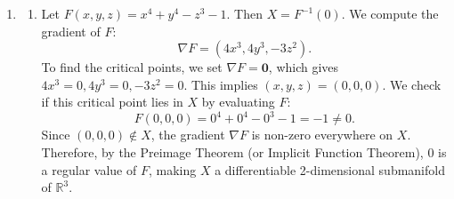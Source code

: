 \documentclass[10pt,a4paper]{article}
\begin{document}
\begin{enumerate}[label=\fbox{\arabic*}]
        To verify directly:
        \begin{align*}
          |x_m(t) - x(t)| &= \left| \left( x_0^{1/2} + \frac{1}{2} f_m(t) \right)^2 - \left( x_0^{1/2} + \frac{1}{2} f(t) \right)^2 \right| \\
          &= \frac{1}{2} |f_m(t) - f(t)| \cdot \left| 2x_0^{1/2} + \frac{1}{2}(f_m(t) + f(t)) \right| \\
          &\le \frac{1}{2} \cdot \frac{2}{m} \cdot \left( 2x_0^{1/2} + \frac{\pi}{2} \right) \xrightarrow{m \to \infty} 0.
        \end{align*}
        Thus, $x_m(t)$ converges uniformly to the continuous function $x(t)$ on $[0, \infty)$.

  \item %
        \begin{enumerate}[label=(\arabic*)]
          \item Let $F(x,y,z) = x^4 + y^4 - z^3 - 1$. Then $X = F^{-1}(0)$. We compute the gradient of $F$:
          \[
            \nabla F = (4x^3, 4y^3, -3z^2).
          \]
          To find the critical points, we set $\nabla F = \mathbf{0}$, which gives $4x^3 = 0, 4y^3 = 0, -3z^2 = 0$. This implies $(x, y, z) = (0, 0, 0)$.
          We check if this critical point lies in $X$ by evaluating $F$:
          \[
            F(0,0,0) = 0^4 + 0^4 - 0^3 - 1 = -1 \neq 0.
          \]
          Since $(0,0,0) \notin X$, the gradient $\nabla F$ is non-zero everywhere on $X$. Therefore, by the Preimage Theorem (or Implicit Function Theorem), 0 is a regular value of $F$, making $X$ a differentiable 2-dimensional submanifold of $\mathbb{R}^3$.
          

\end{enumerate}
\end{enumerate}
\end{document}

